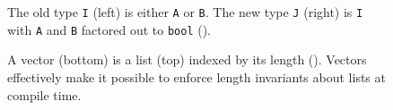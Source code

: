 


\begin{figure}
\begin{minipage}{0.48\columnwidth}

\end{minipage}
\hfill
\begin{minipage}{0.48\columnwidth}

\end{minipage}
\vspace{-0.4cm}
\caption{The old type \lstinline{I} (left) is either \lstinline{A} or \lstinline{B}. The new type \lstinline{J} (right) is \lstinline{I} with \lstinline{A} and \lstinline{B} factored out to \lstinline{bool} ().}
\label{fig:equivalence2}
\end{figure}

\begin{figure}
\begin{minipage}{0.48\textwidth}
   
\end{minipage}
\hfill
\begin{minipage}{0.58\textwidth}
   
\end{minipage}
\vspace{-0.4cm}
\caption{A vector (bottom) is a list (top) indexed by its length (). Vectors effectively make it possible to enforce length invariants about lists at compile time.}
\label{fig:listtovect}
\end{figure}

